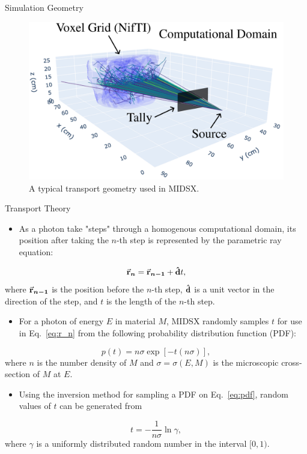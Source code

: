 \documentclass[final]{beamer}
\newlength{\colwidth}
\begin{document}
\begin{frame}[t]
\begin{columns}[t]
\begin{column}{\colwidth}
\begin{block}{Simulation Geometry}
    \begin{figure}
      \centering
      \includegraphics[width = \colwidth]{comp_domain.pdf}
      \caption{A typical transport geometry used in MIDSX.}
    \end{figure}
    

  \end{block}

  \begin{block}{Transport Theory}

    \begin{itemize}
      \item As a photon take "steps" through a homogenous computational domain, its position after taking the $n$-th step is represented by the parametric ray equation:
    \end{itemize}
    \begin{equation} \label{eq:r_n}
        \va{r}_{\bm{n}} = \va{r}_{\bm{n-1}} + \vu{d}t,
    \end{equation}
    where $\va{r}_{\bm{n-1}}$ is the position before the $n$-th step, $\vu{d}$ is a unit vector in the direction of the step, and $t$ is the length of the $n$-th step.
    \begin{itemize}
      \item For a photon of energy $E$ in material $M$, MIDSX randomly samples $t$ for use in Eq.~\ref{eq:r_n} from the following probability distribution function (PDF):
    \end{itemize}
    \begin{equation} \label{eq:pdf}
      p(t) = n\sigma \exp\left[-t(n\sigma)\right],
    \end{equation}
    where $n$ is the number density of $M$ and $\sigma = \sigma(E, M)$ is the microscopic cross-section of $M$ at $E$.
    \begin{itemize}
      \item Using the inversion method for sampling a PDF on Eq.~\ref{eq:pdf}, random values of $t$ can be generated from
    \end{itemize}
    \begin{equation} \label{eq:t_inv}
      t = -\frac{1}{n\sigma} \ln \gamma, 
    \end{equation}
    where $\gamma$ is a uniformly distributed random number in the interval $[0, 1)$.
  \end{block}


\end{column}
\end{columns}
\end{frame}
\end{document}
